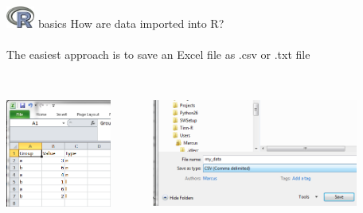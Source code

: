 \documentclass[xcolor=svgnames]{beamer}\usepackage[]{graphicx}\usepackage[]{color}
\begin{document}
\begin{frame}[t,fragile]{\includegraphics[width=0.07\textwidth]{Rlogo.jpg} \hspace{0.01in} basics}
How are data imported into R?\\~\\
The easiest approach is to save an Excel file as .csv or .txt file\\~\\
\begin{columns}
\begin{column}{0.43\textwidth}
\begin{center}
\includegraphics[width = 0.8\textwidth]{my_dat.png}
\end{center}
\end{column}
\begin{column}{0.66\textwidth}
\begin{center}
\includegraphics[width = 0.8\textwidth]{save_as.png}
\end{center}
\end{column}
\end{columns}
\end{frame}
\end{document}
